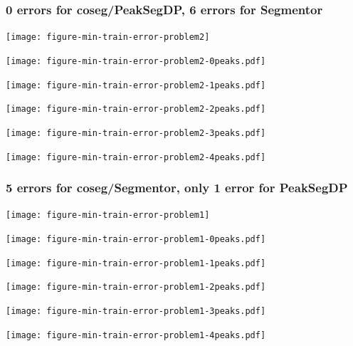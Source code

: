 \documentclass{beamer}
\begin{document}
\begin{frame}
  \frametitle{0 errors for coseg/PeakSegDP, 6 errors for Segmentor}
  \texttt{[image: figure-min-train-error-problem2]}
\end{frame}

\begin{frame}
  \texttt{[image: figure-min-train-error-problem2-0peaks.pdf]}
\end{frame}

\begin{frame}
  \texttt{[image: figure-min-train-error-problem2-1peaks.pdf]}
\end{frame}

\begin{frame}
  \texttt{[image: figure-min-train-error-problem2-2peaks.pdf]}
\end{frame}

\begin{frame}
  \texttt{[image: figure-min-train-error-problem2-3peaks.pdf]}
\end{frame}

\begin{frame}
  \texttt{[image: figure-min-train-error-problem2-4peaks.pdf]}
\end{frame}

\begin{frame}
  \frametitle{5 errors for coseg/Segmentor, only 1 error for PeakSegDP}
  \texttt{[image: figure-min-train-error-problem1]}
\end{frame}


\begin{frame}
  \texttt{[image: figure-min-train-error-problem1-0peaks.pdf]}
\end{frame}

\begin{frame}
  \texttt{[image: figure-min-train-error-problem1-1peaks.pdf]}
\end{frame}

\begin{frame}
  \texttt{[image: figure-min-train-error-problem1-2peaks.pdf]}
\end{frame}

\begin{frame}
  \texttt{[image: figure-min-train-error-problem1-3peaks.pdf]}
\end{frame}

\begin{frame}
  \texttt{[image: figure-min-train-error-problem1-4peaks.pdf]}
\end{frame}
\end{document}
